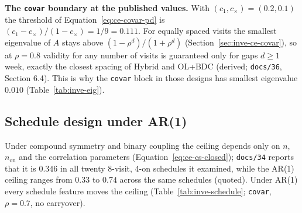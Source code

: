 \documentclass[11pt]{article}
\newcommand{\code}[1]{\texttt{#1}}
\begin{document}
\textbf{The \code{covar} boundary at the published values.} With
$(c_1, c_\times) = (0.2, 0.1)$ the threshold of
Equation~\eqref{eq:ce-covar-pd} is
$(c_1-c_\times)/(1-c_\times) = 1/9 = 0.111$. For equally spaced visits
the smallest eigenvalue of $A$ stays above $(1-\rho^d)/(1+\rho^d)$
(Section~\ref{sec:inve-ce-covar}), so at $\rho = 0.8$ validity for any
number of visits is guaranteed only for gaps $d \ge 1$ week, exactly
the closest spacing of Hybrid and OL+BDC (derived; \code{docs/36},
Section 6.4). This is why the \code{covar} block in those designs has
smallest eigenvalue $0.010$ (Table~\ref{tab:inve-eig}).

\subsection{Schedule design under AR(1)}
\label{sec:inve-ce-schedule}

Under compound symmetry and binary coupling the ceiling depends only
on $n$, $n_{\mathrm{on}}$ and the correlation parameters
(Equation~\eqref{eq:ce-cs-closed}); \code{docs/34} reports that it is
$0.346$ in all twenty 8-visit, 4-on schedules it examined, while the
AR(1) ceiling ranges from $0.33$ to $0.74$ across the same schedules
(quoted). Under AR(1) every schedule feature moves the ceiling
(Table~\ref{tab:inve-schedule}; \code{covar}, $\rho = 0.7$, no
carryover).
\end{document}

